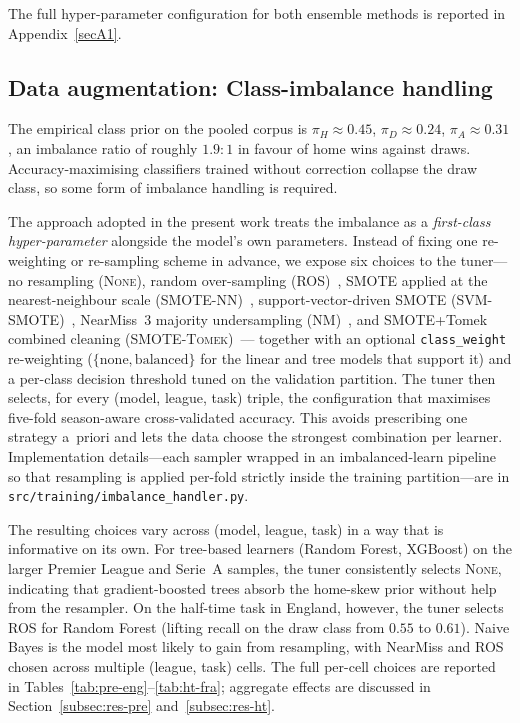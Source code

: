 \documentclass[pdflatex,sn-mathphys-num]{sn-jnl}
\theoremstyle{thmstyleone}
\theoremstyle{thmstyletwo}
\theoremstyle{thmstylethree}
\begin{document}
The full hyper-parameter configuration for both ensemble methods is reported in Appendix~\ref{secA1}.

\subsection{Data augmentation: Class-imbalance handling}\label{subsec:imbalance}

The empirical class prior on the pooled corpus is
$\pi_H\!\approx\!0.45$, $\pi_D\!\approx\!0.24$,
$\pi_A\!\approx\!0.31$, an imbalance ratio of roughly $1.9{:}1$ in
favour of home wins against draws. Accuracy-maximising classifiers
trained without correction collapse the draw class, so some form of
imbalance handling is required.

The approach adopted in the present work treats the imbalance as a
\emph{first-class hyper-parameter} alongside the model's own
parameters. Instead of fixing one re-weighting or re-sampling scheme
in advance, we expose six choices to the tuner---no resampling
(\textsc{None}), random over-sampling
(\textsc{ROS})~\cite{bib_ros}, SMOTE applied at the
nearest-neighbour scale (\textsc{SMOTE-NN})~\cite{bib_smote},
support-vector-driven SMOTE (\textsc{SVM-SMOTE})~\cite{bib_svmsmote},
NearMiss~3 majority undersampling (\textsc{NM})~\cite{bib_nm}, and
SMOTE+Tomek combined cleaning (\textsc{SMOTE-Tomek})~\cite{bib_smotetomek}---
together with an optional \texttt{class\_weight} re-weighting
($\{\text{none},\text{balanced}\}$ for the linear and tree models
that support it) and a per-class decision threshold tuned on the
validation partition. The tuner then selects, for every (model,
league, task) triple, the configuration that maximises
five-fold season-aware cross-validated accuracy. This avoids
prescribing one strategy a~priori and lets the data choose the
strongest combination per learner. Implementation details---each
sampler wrapped in an imbalanced-learn pipeline so that resampling
is applied per-fold strictly inside the training partition---are in
\texttt{src/training/imbalance\_handler.py}.

The resulting choices vary across (model, league, task)
in a way that is informative on its own. For tree-based learners
(Random Forest, XGBoost) on the larger Premier League and Serie~A
samples, the tuner consistently selects \textsc{None}, indicating
that gradient-boosted trees absorb the home-skew prior without help
from the resampler. On the half-time task in England, however, the
tuner selects ROS for Random Forest (lifting recall on the draw
class from $0.55$ to $0.61$). Naive Bayes is the model most likely
to gain from resampling, with NearMiss and ROS chosen across multiple
(league, task) cells. The full per-cell choices are reported in
Tables~\ref{tab:pre-eng}--\ref{tab:ht-fra}; aggregate effects are
discussed in Section~\ref{subsec:res-pre} and~\ref{subsec:res-ht}.
\end{document}
